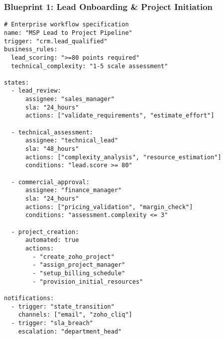 \subsubsection{Blueprint 1: Lead Onboarding \& Project Initiation}
\begin{verbatim}
# Enterprise workflow specification
name: "MSP Lead to Project Pipeline"
trigger: "crm.lead_qualified"
business_rules:
  lead_scoring: ">=80 points required"
  technical_complexity: "1-5 scale assessment"
  
states:
  - lead_review:
      assignee: "sales_manager"
      sla: "24_hours"
      actions: ["validate_requirements", "estimate_effort"]
      
  - technical_assessment:
      assignee: "technical_lead" 
      sla: "48_hours"
      actions: ["complexity_analysis", "resource_estimation"]
      conditions: "lead.score >= 80"
      
  - commercial_approval:
      assignee: "finance_manager"
      sla: "24_hours" 
      actions: ["pricing_validation", "margin_check"]
      conditions: "assessment.complexity <= 3"
      
  - project_creation:
      automated: true
      actions: 
        - "create_zoho_project"
        - "assign_project_manager" 
        - "setup_billing_schedule"
        - "provision_initial_resources"

notifications:
  - trigger: "state_transition"
    channels: ["email", "zoho_cliq"]
  - trigger: "sla_breach"
    escalation: "department_head"
\end{verbatim}

